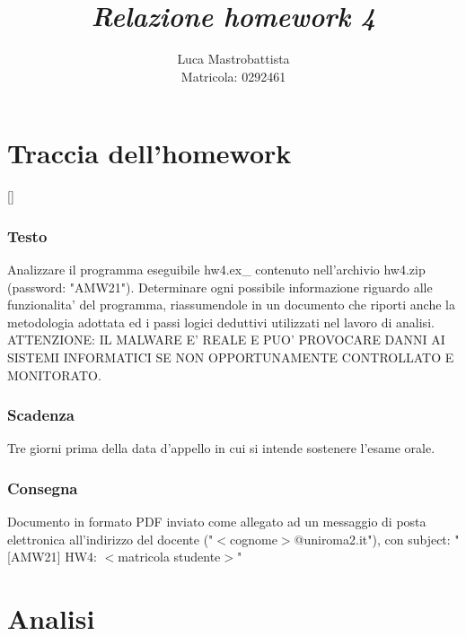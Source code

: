 \documentclass[a4paper, 12pt]{article}
\newcommand{\makesub}[1]{%
  \saveexpandmode\noexpandarg
  \StrSubstitute{#1}{\_}{_}[\temp]%
  \restoreexpandmode%
}
\newcommand{\target}[1]{%
  \makesub{#1}%
  \hypertarget{\temp}{}%
}
\begin{document}
\sloppy
  
\title{
  \textbf{
    \emph{Relazione homework 4}
  }
}  
\author{Luca Mastrobattista\\Matricola: 0292461}
\date{}
\maketitle

\tableofcontents
\newpage
\part{Traccia dell'homework}
\target{consegna}
\section{Testo}
Analizzare il programma eseguibile hw4.ex\_ contenuto
nell'archivio hw4.zip (password: "AMW21").
Determinare ogni possibile informazione riguardo alle
funzionalita' del programma, riassumendole in un documento
che riporti anche la metodologia adottata ed i passi logici
deduttivi utilizzati nel lavoro di analisi.\\
ATTENZIONE: IL MALWARE E' REALE E PUO' PROVOCARE DANNI AI
SISTEMI INFORMATICI SE NON OPPORTUNAMENTE CONTROLLATO E
MONITORATO.

\section{Scadenza}
Tre giorni prima della data d'appello in cui si
intende sostenere l'esame orale.

\section{Consegna}
Documento in formato PDF inviato come allegato ad
un messaggio di posta elettronica all'indirizzo del docente
("$<$cognome$>$@uniroma2.it"), con subject:
"[AMW21] HW4: $<$matricola studente$>$"


\newpage
\part{Analisi}
\end{document}
